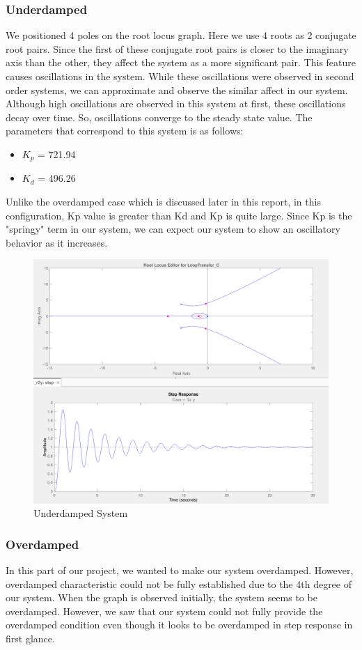 \subsubsection{Underdamped}
We positioned 4 poles on the root locus graph. Here we use 4 roots as 2 conjugate root pairs. Since the first of these conjugate root pairs is closer to the imaginary axis than the other, they affect the system as a more significant pair. This feature causes oscillations in the system. While these oscillations were observed in second order systems, we can approximate and observe the similar affect in our system. Although high oscillations are observed in this system at first, these oscillations decay over time. So, oscillations converge to the steady state value. The parameters that correspond to this system is as follows:
\begin{itemize}
    \item $K_p$ = 721.94
    \item$K_d$ = 496.26
\end{itemize}

Unlike the overdamped case which is discussed later in this report, in this configuration, Kp value is greater than Kd and Kp is quite large. Since Kp is the "springy" term in our system, we can expect our system to show an oscillatory behavior as it increases. 

\begin{figure}[H]
    \centering
    \includegraphics[width=.8\textwidth]{images/underdamped_csd.png}
    \caption{Underdamped System}
    \label{fig:under_csd}
\end{figure}

\subsubsection{Overdamped}
In this part of our project, we wanted to make our system overdamped. However, overdamped characteristic could not be fully established due to the 4th degree of our system. When the graph is observed initially, the system seems to be overdamped. However, we saw that our system could not fully provide the overdamped condition even though it looks to be overdamped in step response in first glance. \\



